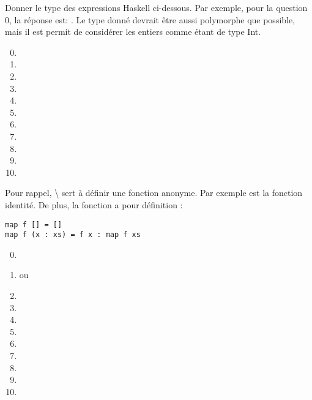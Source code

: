 \begin{Exercise}
\label{ex:type_inference3}
Donner le type des expressions Haskell ci-dessous. Par exemple, pour
la question 0, la réponse est: . Le type donné
devrait être aussi polymorphe que possible, mais il est permit de
considérer les entiers comme étant de type Int.

\begin{enumerate}
\setcounter{enumi}{-1}
\item {}
\item \codeinline{[['a', 'b'], []]}
\item \codeinline{(['a', 'b'], [])}
\item {}
\item {}
\item {}
\item {}
\item {}
\item {}
\item {}
\item {}
\end{enumerate}

Pour rappel, {\textbackslash } sert à définir une fonction anonyme. Par
  exemple  est la fonction identité. De plus, la
  fonction  a pour définition :
\begin{verbatim}
map f [] = []               
map f (x : xs) = f x : map f xs
\end{verbatim}

\end{Exercise}

\begin{Answer}[ref={ex:type_inference3}]
\begin{enumerate}
\setcounter{enumi}{-1}
\item {}
\item \codeinline{[Char]} ou 
\item \codeinline{([Char], [a])}
\item {}
\item {}
\item {}
\item \codeinline{[Int]}
\item {}
\item \codeinline{[Int] -> [Int]}
\item \codeinline{[Char]}
\item {}
\end{enumerate}
  
\end{Answer}
